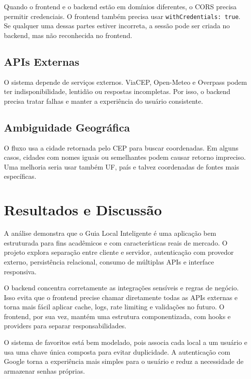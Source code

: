 \documentclass[
    12pt,
    oneside,
    openright,
    a4paper,
    english,
    brazil
]{abntex2}
\begin{document}
Quando o frontend e o backend estão em domínios diferentes, o CORS precisa permitir credenciais. O frontend também precisa usar \texttt{withCredentials: true}. Se qualquer uma dessas partes estiver incorreta, a sessão pode ser criada no backend, mas não reconhecida no frontend.

\section{APIs Externas}

O sistema depende de serviços externos. ViaCEP, Open-Meteo e Overpass podem ter indisponibilidade, lentidão ou respostas incompletas. Por isso, o backend precisa tratar falhas e manter a experiência do usuário consistente.

\section{Ambiguidade Geográfica}

O fluxo usa a cidade retornada pelo CEP para buscar coordenadas. Em alguns casos, cidades com nomes iguais ou semelhantes podem causar retorno impreciso. Uma melhoria seria usar também UF, país e talvez coordenadas de fontes mais específicas.


\chapter{Resultados e Discussão}

A análise demonstra que o Guia Local Inteligente é uma aplicação bem estruturada para fins acadêmicos e com características reais de mercado. O projeto explora separação entre cliente e servidor, autenticação com provedor externo, persistência relacional, consumo de múltiplas APIs e interface responsiva.

O backend concentra corretamente as integrações sensíveis e regras de negócio. Isso evita que o frontend precise chamar diretamente todas as APIs externas e torna mais fácil aplicar cache, logs, rate limiting e validações no futuro. O frontend, por sua vez, mantém uma estrutura componentizada, com hooks e providers para separar responsabilidades.

O sistema de favoritos está bem modelado, pois associa cada local a um usuário e usa uma chave única composta para evitar duplicidade. A autenticação com Google torna a experiência mais simples para o usuário e reduz a necessidade de armazenar senhas próprias.
\end{document}
